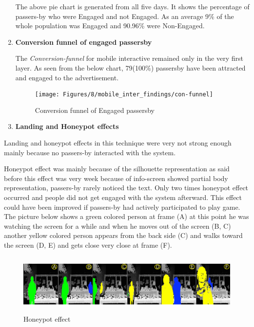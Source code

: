 \begin{enumerate}
The above pie chart is generated from all five days. It shows the percentage of passers-by who were Engaged and not Engaged. As an average 9\% of the whole population was Engaged and 90.96\% were Non-Engaged.



\item \textbf{Conversion funnel of engaged passersby}

The \emph{Conversion-funnel} for mobile interactive remained only in the very first layer. As seen from the below chart, 79(100\%) passersby have been attracted and engaged to the advertisement. 

\begin{figure}[H]
    \centering
    \texttt{[image: Figures/8/mobile\_inter\_findings/con-funnel]}
    \caption{Conversion funnel of Engaged passersby}%
    \label{fig:bodyengagedpasserbypercentage}%
\end{figure}



\item \textbf{Landing and Honeypot effects}
\end{enumerate}

Landing and honeypot effects in this technique were very not strong enough mainly because no passers-by interacted with the system.

Honeypot effect was mainly because of the silhouette representation as said before this effect was very week because of info-screen showed partial body representation, passers-by rarely noticed the text. Only two times honeypot effect occurred and people did not get engaged with the system afterward. This effect could have been improved if passers-by had actively participated to play game.  The picture below shows a green colored person at frame (A) at this point he was watching the screen for a while and when he moves out of the screen (B, C) another yellow colored person appears from the back side (C) and walks toward the screen (D, E) and gets close very close at frame (F).

\begin{minipage}{0.95\textwidth}
\begin{flushright}
\begin{figure}[H]
    \centering
    \includegraphics[width=\textwidth,height=30mm]{Figures/8/mobile_inter_findings/effects/honeypot}
    \caption{Honeypot effect}
    \label{fig:mobile_honeypoteffect}
\end{figure}
\end{flushright}
\end{minipage}


